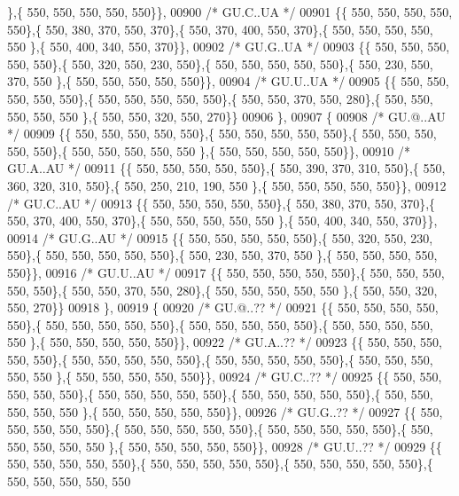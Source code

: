 \begin{DoxyCode}
      \},\{ 550, 550, 550, 550, 550\}\},
00900 \textcolor{comment}{/* GU.C..UA */}
00901 \{\{ 550, 550, 550, 550, 550\},\{ 550, 380, 370, 550, 370\},\{ 550, 370, 400, 550, 370\},\{ 550, 550, 550, 550, 550
      \},\{ 550, 400, 340, 550, 370\}\},
00902 \textcolor{comment}{/* GU.G..UA */}
00903 \{\{ 550, 550, 550, 550, 550\},\{ 550, 320, 550, 230, 550\},\{ 550, 550, 550, 550, 550\},\{ 550, 230, 550, 370, 550
      \},\{ 550, 550, 550, 550, 550\}\},
00904 \textcolor{comment}{/* GU.U..UA */}
00905 \{\{ 550, 550, 550, 550, 550\},\{ 550, 550, 550, 550, 550\},\{ 550, 550, 370, 550, 280\},\{ 550, 550, 550, 550, 550
      \},\{ 550, 550, 320, 550, 270\}\}
00906 \},
00907 \{
00908 \textcolor{comment}{/* GU.@..AU */}
00909 \{\{ 550, 550, 550, 550, 550\},\{ 550, 550, 550, 550, 550\},\{ 550, 550, 550, 550, 550\},\{ 550, 550, 550, 550, 550
      \},\{ 550, 550, 550, 550, 550\}\},
00910 \textcolor{comment}{/* GU.A..AU */}
00911 \{\{ 550, 550, 550, 550, 550\},\{ 550, 390, 370, 310, 550\},\{ 550, 360, 320, 310, 550\},\{ 550, 250, 210, 190, 550
      \},\{ 550, 550, 550, 550, 550\}\},
00912 \textcolor{comment}{/* GU.C..AU */}
00913 \{\{ 550, 550, 550, 550, 550\},\{ 550, 380, 370, 550, 370\},\{ 550, 370, 400, 550, 370\},\{ 550, 550, 550, 550, 550
      \},\{ 550, 400, 340, 550, 370\}\},
00914 \textcolor{comment}{/* GU.G..AU */}
00915 \{\{ 550, 550, 550, 550, 550\},\{ 550, 320, 550, 230, 550\},\{ 550, 550, 550, 550, 550\},\{ 550, 230, 550, 370, 550
      \},\{ 550, 550, 550, 550, 550\}\},
00916 \textcolor{comment}{/* GU.U..AU */}
00917 \{\{ 550, 550, 550, 550, 550\},\{ 550, 550, 550, 550, 550\},\{ 550, 550, 370, 550, 280\},\{ 550, 550, 550, 550, 550
      \},\{ 550, 550, 320, 550, 270\}\}
00918 \},
00919 \{
00920 \textcolor{comment}{/* GU.@..?? */}
00921 \{\{ 550, 550, 550, 550, 550\},\{ 550, 550, 550, 550, 550\},\{ 550, 550, 550, 550, 550\},\{ 550, 550, 550, 550, 550
      \},\{ 550, 550, 550, 550, 550\}\},
00922 \textcolor{comment}{/* GU.A..?? */}
00923 \{\{ 550, 550, 550, 550, 550\},\{ 550, 550, 550, 550, 550\},\{ 550, 550, 550, 550, 550\},\{ 550, 550, 550, 550, 550
      \},\{ 550, 550, 550, 550, 550\}\},
00924 \textcolor{comment}{/* GU.C..?? */}
00925 \{\{ 550, 550, 550, 550, 550\},\{ 550, 550, 550, 550, 550\},\{ 550, 550, 550, 550, 550\},\{ 550, 550, 550, 550, 550
      \},\{ 550, 550, 550, 550, 550\}\},
00926 \textcolor{comment}{/* GU.G..?? */}
00927 \{\{ 550, 550, 550, 550, 550\},\{ 550, 550, 550, 550, 550\},\{ 550, 550, 550, 550, 550\},\{ 550, 550, 550, 550, 550
      \},\{ 550, 550, 550, 550, 550\}\},
00928 \textcolor{comment}{/* GU.U..?? */}
00929 \{\{ 550, 550, 550, 550, 550\},\{ 550, 550, 550, 550, 550\},\{ 550, 550, 550, 550, 550\},\{ 550, 550, 550, 550, 550

\end{DoxyCode}
